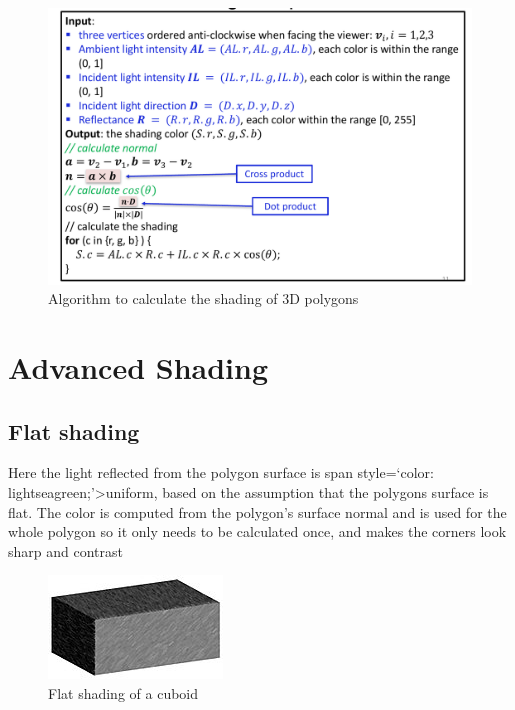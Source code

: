 \documentclass[
]{book}
\begin{document}
\begin{figure}
\centering
\includegraphics{img/08-image29.png}
\caption{\label{fig:shading}Algorithm to calculate the shading of 3D polygons}
\end{figure}

\hypertarget{advanced-shading}{%
\section{Advanced Shading}\label{advanced-shading}}

\hypertarget{flat-shading}{%
\subsection{Flat shading}\label{flat-shading}}

Here the light reflected from the polygon surface is span style=`color: lightseagreen;'\textgreater uniform, based on the assumption that the polygons surface is flat. The color is computed from the polygon's surface normal and is used for the whole polygon so it only needs to be calculated once, and makes the corners look sharp and contrast

\begin{figure}
\centering
\includegraphics{img/08-image30.jpg}
\caption{\label{fig:flat-shading}Flat shading of a cuboid}
\end{figure}
\end{document}
